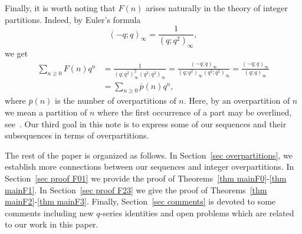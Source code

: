 \documentclass{amsart}
\numberwithin{equation}{section}
\theoremstyle{definition}
\newcommand{\fr}{\frac}
\begin{document}
Finally, it is worth noting that $F(n)$ arises naturally in the theory of integer partitions. Indeed,
by Euler's formula~\cite{Andrews}
\begin{equation}\label{Euler}
(-q;q)_\infty =\fr{1}{(q;q^2)_\infty},
\end{equation}
we get
\begin{align}
\sum_{n\geq 0} F(n) q^n &=\fr{1}{(q;q^2)_\infty^2 (q^2;q^2)_\infty} =\fr{(-q;q)_\infty}{(q;q^2)_\infty (q^2;q^2)_\infty}
= \fr{(-q;q)_\infty}{(q;q)_\infty} \nonumber \\
&=\sum_{n\geq 0}\overline{p}(n) q^n, \label{F-id}
\end{align}
where $\overline{p}(n)$ is the number of overpartitions of $n$.
Here, by an overpartition of $n$ we mean a partition of $n$ where the first occurrence of a part may be overlined,
see~\cite{Corteel-Lovejoy}.
Our third goal in this note is to express some of our sequences and their subsequences in terms of overpartitions.

The rest of the paper is organized as follows.
In Section~\ref{sec overpartitions}, we establish more connections between our sequences and integer overpartitions.
In Section~\ref{sec proof F01} we provide the proof of Theorems~\ref{thm mainF0}-\ref{thm mainF1}.
In Section~\ref{sec proof F23} we give the proof of Theorems~\ref{thm mainF2}-\ref{thm mainF3}.
Finally, Section~\ref{sec comments} is devoted to some comments including
new $q$-series identities and open problems which are related to our work in this paper.
%
\end{document}
